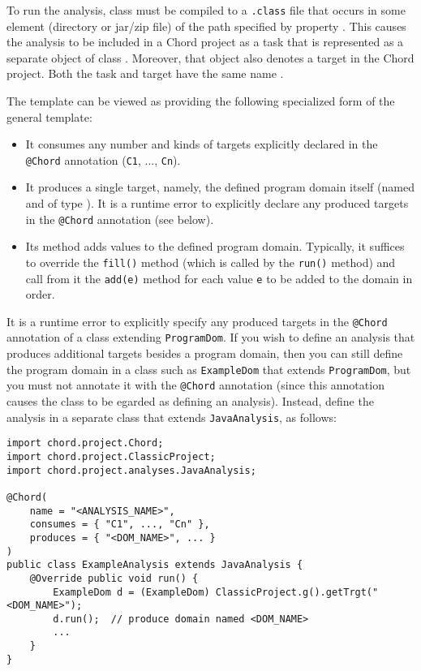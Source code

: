 To run the analysis, class  must be compiled to a {\tt .class}
file that occurs in some element (directory or jar/zip file) of the path
specified by property .  This causes the
analysis to be included in a Chord project as a task that is represented as a
separate object of class .  Moreover, that object also denotes
a target in the Chord project.  Both the task and target have the same name
.

The  template can be viewed as providing the following
specialized form of the general  template:

\begin{itemize}
\item
It consumes any number and kinds of targets explicitly declared in the 
{\tt @Chord} annotation ({\tt C1}, ..., {\tt Cn}).
\item
It produces a single target, namely, the defined program domain itself
(named  and of type ).  It is a runtime error
to explicitly declare any produced targets in the {\tt @Chord} annotation (see
below).
\item
Its  method adds values to the defined program domain.  Typically,
it suffices to override the {\tt fill()} method (which is called by the
{\tt run()} method) and call from it the {\tt add(e)} method for each value
{\tt e} to be added to the domain in order.
\end{itemize}

It is a runtime error to explicitly specify any produced targets in the
{\tt @Chord} annotation of a class extending {\tt ProgramDom}.  If you wish to
define an analysis that produces additional targets besides a program domain,
then you can still define the program domain in a class such as
{\tt ExampleDom} that extends {\tt ProgramDom}, but you must not annotate it
with the {\tt @Chord} annotation (since this annotation causes the class to be 
egarded as defining an analysis).  Instead, define the analysis in a separate
class that extends {\tt JavaAnalysis}, as follows:

\begin{framed}
\begin{verbatim}
import chord.project.Chord;
import chord.project.ClassicProject;
import chord.project.analyses.JavaAnalysis;

@Chord(
    name = "<ANALYSIS_NAME>",
    consumes = { "C1", ..., "Cn" },
    produces = { "<DOM_NAME>", ... }
)
public class ExampleAnalysis extends JavaAnalysis {
    @Override public void run() {
        ExampleDom d = (ExampleDom) ClassicProject.g().getTrgt("<DOM_NAME>");
        d.run();  // produce domain named <DOM_NAME>
        ...
    }
}
\end{verbatim}
\end{framed}

